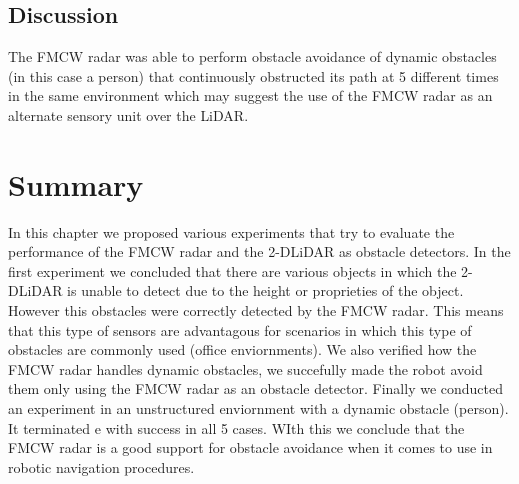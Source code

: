 \subsection{Discussion}
 The \ac{FMCW} radar was able to perform 
obstacle avoidance of dynamic obstacles (in this case a person) that continuously obstructed its path at 5 different times in the same environment which may suggest the use of the \ac{FMCW} \ac{radar} as an alternate sensory unit over the \ac{LiDAR}.

\section{Summary}
In this chapter we proposed various experiments that try to evaluate the performance of the \ac{FMCW} \ac{radar} and the 2-D\ac{LiDAR} as obstacle detectors. In the first experiment we concluded that there are various objects in which the 2-D\ac{LiDAR} is unable to detect due to the height or proprieties of the object. However this obstacles were correctly detected by the \ac{FMCW} \ac{radar}. This means that this type of sensors  are advantagous for scenarios in which this type of obstacles are commonly used (office enviornments). We also verified how the FMCW radar handles dynamic obstacles, we succefully made the robot avoid them only using the \ac{FMCW} \ac{radar} as an obstacle detector. Finally we conducted an experiment in an unstructured enviornment with a dynamic obstacle (person). It terminated e with success in all 5 cases. WIth this we conclude that the \ac{FMCW} \ac{radar} is a good support for obstacle avoidance when it comes to use in robotic navigation procedures.

